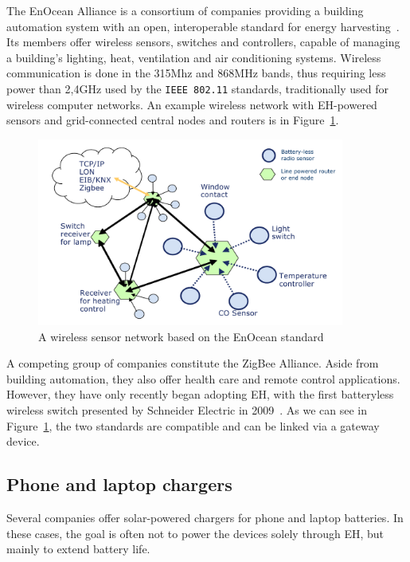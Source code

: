 \documentclass[a4paper,10pt]{article}
\begin{document}
The EnOcean Alliance is a consortium of companies providing a building automation system with an open, interoperable standard for energy harvesting~\cite{enocean}. Its members offer wireless sensors, switches and controllers, capable of managing a building's lighting, heat, ventilation and air conditioning systems. Wireless communication is done in the 315Mhz and 868MHz bands, thus requiring less power than 2,4GHz used by the \texttt{IEEE 802.11} standards, traditionally used for wireless computer networks. An example wireless network with \ac{EH}-powered sensors and grid-connected central nodes and routers is in Figure~\ref{fig:enocean-shema}. 

\begin{figure}[h]
\centering
 \includegraphics[width=0.9\textwidth]{./Slike/EnOcean-shema}
\caption{A wireless sensor network based on the EnOcean standard~\cite{enocean}}
\label{fig:enocean-shema}
\end{figure}

A competing group of companies constitute the ZigBee Alliance. Aside from building automation, they also offer health care and remote control applications. However, they have only recently began adopting \ac{EH}, with the first batteryless wireless switch presented by Schneider Electric in 2009~\cite{schneider-zb}. As we can see in Figure~\ref{fig:enocean-shema}, the two standards are compatible and can be linked via a gateway device. 

\subsection{Phone and laptop chargers}

Several companies offer solar-powered chargers for phone and laptop batteries. In these cases, the goal is often not to power the devices solely through \ac{EH}, but mainly to extend battery life. 
\end{document}

